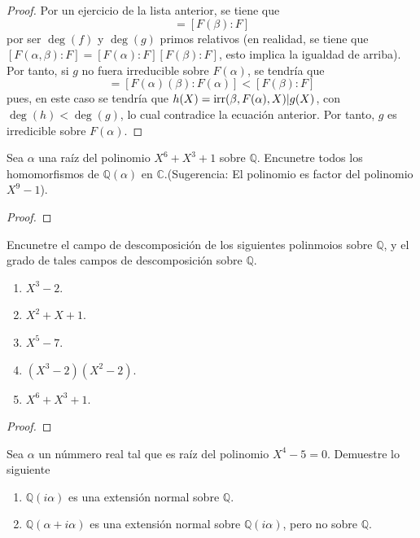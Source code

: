 \documentclass[12pt]{report}
\theoremstyle{largebreak}
\newcommand\irr{\textup{irr}}
\begin{document}
\begin{proof}
    Por un ejercicio de la lista anterior, se tiene que
    \begin{equation*}
        [F(\alpha,\beta):F(\alpha)]=[F(\beta):F]
    \end{equation*}
    por ser $\deg(f)$ y $\deg(g)$ primos relativos (en realidad, se tiene que $[F(\alpha,\beta):F]=[F(\alpha):F][F(\beta):F]$, esto implica la igualdad de arriba). Por tanto, si $g$ no fuera irreducible sobre $F(\alpha)$, se tendría que
    \begin{equation*}
        [F(\alpha,\beta):F(\alpha)]=[F(\alpha)(\beta):F(\alpha)]<[F(\beta):F]
    \end{equation*}
    pues, en este caso se tendría que $h(X)=\irr(\beta,F(\alpha),X)|g(X)$, con $\deg(h)<\deg(g)$, lo cual contradice la ecuación anterior. Por tanto, $g$ es irredicible sobre $F(\alpha)$.
\end{proof}

\begin{excer}
    Sea $\alpha$ una raíz del polinomio $X^6+X^3+1$ sobre $\mathbb{Q}$. Encunetre todos los homomorfismos de $\mathbb{Q}(\alpha)$ en $\mathbb{C}$.(Sugerencia: El polinomio es factor del polinomio $X^9-1$).
\end{excer}

\begin{proof}
    
\end{proof}

\begin{excer}
    Encunetre el campo de descomposición de los siguientes polinmoios sobre $\mathbb{Q}$, y el grado de tales campos de descomposición sobre $\mathbb{Q}$.
    \begin{enumerate}
        \item $X^3-2$.
        \item $X^2+X+1$.
        \item $X^5-7$.
        \item $(X^3-2)(X^2-2)$.
        \item $X^6+X^3+1$.
    \end{enumerate}
\end{excer}

\begin{proof}
    
\end{proof}

\begin{excer}
    Sea $\alpha$ un númmero real tal que es raíz del polinomio $X^4-5=0$. Demuestre lo siguiente
    \begin{enumerate}
        \item $\mathbb{Q}(i\alpha)$ es una extensión normal sobre $\mathbb{Q}$.
        \item $\mathbb{Q}(\alpha+i\alpha)$ es una extensión normal sobre $\mathbb{Q}(i\alpha)$, pero no sobre $\mathbb{Q}$.
    \end{enumerate}
\end{excer}
\end{document}
